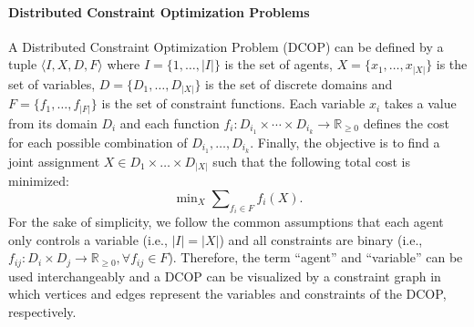 \documentclass[letterpaper]{article} %
\begin{document}
\paragraph{Distributed Constraint Optimization Problems} A Distributed Constraint Optimization Problem (DCOP) \cite{modi2005adopt} can be defined by a tuple $\langle I,X,D,F\rangle$ where $I=\{1,\dots,|I|\}$ is the set of agents, $X=\{x_1,\dots,x_{|X|}\}$ is the set of variables, $D=\{D_1,\dots,D_{|X|}\}$ is the set of discrete domains and $F=\{f_1,\dots,f_{|F|}\}$ is the set of constraint functions. Each variable $x_i$ takes a value from its domain $D_i$ and each function $f_i:D_{i_1}\times\cdots \times D_{i_k}\rightarrow \mathbb{R}_{\ge 0}$ defines the cost for each possible combination of $D_{i_1},\dots,D_{i_k}$.
Finally, the objective is to find a joint assignment $X\in D_1\times\dots\times D_{|X|}$ such that the following total cost is minimized:
\begin{equation}
\mathop{\min}\nolimits_X\sum\nolimits_{f_i\in F}f_i(X).
\end{equation}
For the sake of simplicity, we follow the common assumptions that each agent only controls a variable (i.e., $|I|=|X|$) and all constraints are binary (i.e., $f_{ij}: D_i\times D_j\rightarrow\mathbb{R}_{\ge 0}, \forall f_{ij}\in F$). Therefore, the term ``agent'' and ``variable'' can be used interchangeably and a DCOP can be visualized by a constraint graph in which vertices and edges represent the variables and constraints of the DCOP, respectively.
\end{document}

